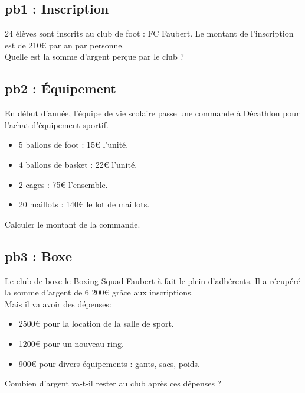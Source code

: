 \subsection*{pb1 : Inscription} 
24 élèves sont inscrits au club de foot : FC Faubert. Le montant de l'inscription est de 210€ par an par personne.\\ 
Quelle est la somme d'argent perçue par le club ?

\subsection*{pb2 : Équipement} 

En début d'année, l'équipe de vie scolaire passe une commande à Décathlon pour l'achat d'équipement sportif.

\begin{itemize}[label={$\bullet$}]
  \item 5 ballons de foot : 15€ l'unité.
  \item 4 ballons de basket : 22€ l'unité.
  \item 2 cages : 75€ l'ensemble. 
  \item 20 maillots : 140€ le lot de maillots. 
\end{itemize} 

Calculer le montant de la commande.

\subsection*{pb3 : Boxe} 
Le club de boxe le Boxing Squad Faubert à fait le plein d'adhérents. Il a récupéré la somme d'argent de 6 200€ grâce aux inscriptions.\\
Mais il va avoir des dépenses: 

\begin{itemize}[label={$\bullet$}]
  \item 2500€ pour la location de la salle de sport.
  \item 1200€ pour un nouveau ring.
  \item 900€ pour divers équipements : gants, sacs, poids.
\end{itemize}

Combien d'argent va-t-il rester au club après ces dépenses ?

